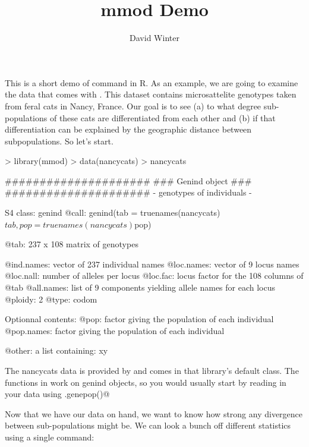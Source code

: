 \documentclass{article}
\begin{document}
\title{mmod Demo}
\author{David Winter}
\maketitle

This is a short demo of \verb@mmod@ command in R. 
As an example, we are going to examine the \verb@nancycats@ data that comes
with \verb@adegenet@. This dataset contains microsattelite genotypes
taken from feral cats in Nancy, France. Our goal is to see (a) to what degree
sub-populations of these cats are differentiated from each other and (b) if that
differentiation can be explained by the geographic distance between subpopulations. 
So let's start. 

\begin{Schunk}
\begin{Sinput}
> library(mmod)
> data(nancycats)
> nancycats
\end{Sinput}
\begin{Soutput}
   #####################
   ### Genind object ### 
   #####################
- genotypes of individuals - 

S4 class:  genind
@call: genind(tab = truenames(nancycats)$tab, pop = truenames(nancycats)$pop)

@tab:  237 x 108 matrix of genotypes

@ind.names: vector of  237 individual names
@loc.names: vector of  9 locus names
@loc.nall: number of alleles per locus
@loc.fac: locus factor for the  108 columns of @tab
@all.names: list of  9 components yielding allele names for each locus
@ploidy:  2
@type:  codom

Optionnal contents: 
@pop:  factor giving the population of each individual
@pop.names:  factor giving the population of each individual

@other: a list containing: xy 
\end{Soutput}
\end{Schunk}

The nancycats data is provided by \verb@adegenet@ and comes in that library's
default \verb@genind@ class. The functions in \verb@mmod@ work on genind objects, 
so you would usually start by reading in your data using \verb@read.genepop()@ 
 
Now that we have our data on hand, we want to know how strong any divergence 
between sub-populations might be. We can look a bunch off different statistics
using a single command:
\end{document}
